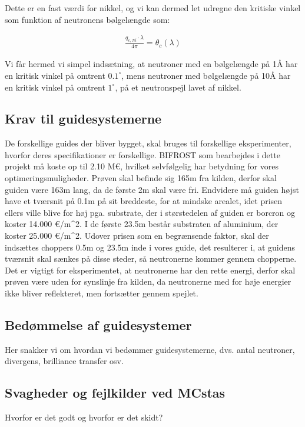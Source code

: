 \documentclass[12pt,oneside,a4paper]{article}
\begin{document}
{{{{{Dette er en fast værdi for nikkel, og vi kan dermed let udregne den kritiske vinkel som funktion af neutronens bølgelængde som: 

\begin{align}
\frac{q_{c,Ni} \cdot \lambda}{4\pi}=\theta_c(\lambda)
\end{align}

Vi får hermed vi simpel indsætning, at neutroner med en bølgelængde på 1Å har en kritisk vinkel på omtrent $0.1^∘$, mens neutroner med bølgelængde på 10Å har en kritisk vinkel på omtrent $1^∘$, på et neutronspejl lavet af nikkel.

\subsection{Krav til guidesystemerne}
De forskellige guides der bliver bygget, skal bruges til forskellige eksperimenter, hvorfor deres specifikationer er forskellige. BIFROST som bearbejdes i dette projekt må koste op til 2.10 M€, hvilket selvfølgelig har betydning for vores optimeringsmuligheder. Prøven skal befinde sig 165m fra kilden, derfor skal guiden være 163m lang, da de første 2m skal være fri. Endvidere må guiden højst have et tværsnit på 0.1m på sit breddeste, for at mindske arealet, idet prisen ellers ville blive for høj pga. substrate, der i størstedelen af guiden er borcron og koster 14.000 €/m^2. I de første 23.5m består substraten af aluminium, der koster 25.000 €/m^2. Udover prisen som en begrænsende faktor, skal der indsættes choppers 0.5m og 23.5m inde i vores guide, det resulterer i, at guidens tværsnit skal sænkes på disse steder, så neutronerne kommer gennem chopperne. Det er vigtigt for eksperimentet, at neutronerne har den rette energi, derfor skal prøven være uden for synslinje fra kilden, da neutronerne med for høje energier ikke bliver reflekteret, men fortsætter gennem spejlet.

\subsection{Bedømmelse af guidesystemer}
Her snakker vi om hvordan vi bedømmer guidesystemerne, dvs. antal neutroner, divergens, brilliance transfer osv.

\subsection{Svagheder og fejlkilder ved MCstas}
Hvorfor er det godt og hvorfor er det skidt?



}}}}}
\end{document}
